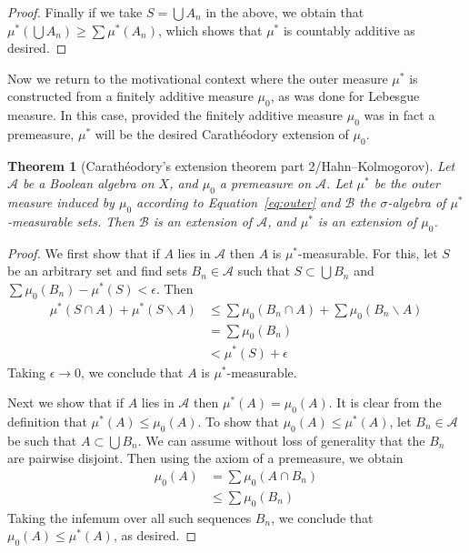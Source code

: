 \documentclass[11pt,oneside]{amsbook}
\renewcommand{\setminus}{\smallsetminus}
\theoremstyle{definition}
\theoremstyle{plain}
\newtheorem{thm}{Theorem}[section]
\theoremstyle{definition}
\theoremstyle{remark}
\numberwithin{equation}{section}
\numberwithin{figure}{section}
\begin{document}
\begin{proof}
  Finally if we take $S=\bigcup A_n$ in the above, we obtain that $\mu^*(\bigcup A_n)\geq\sum\mu^*(A_n)$, which shows that $\mu^*$ is countably additive as desired.
\end{proof}

Now we return to the motivational context where the outer measure $\mu^*$ is constructed from a finitely additive measure $\mu_0$, as was done for Lebesgue measure. In this case, provided the finitely additive measure $\mu_0$ was in fact a premeasure, $\mu^*$ will be the desired Carath\'eodory extension of $\mu_0$.

\begin{thm}[Carath\'eodory's extension theorem part 2/Hahn--Kolmogorov]
  Let $\mathcal A$ be a Boolean algebra on $X$, and $\mu_0$ a premeasure on $\mathcal A$. Let $\mu^*$ be the outer measure induced by $\mu_0$ according to Equation~\eqref{eq:outer} and $\mathcal B$ the $\sigma$-algebra of $\mu^*$-measurable sets. Then $\mathcal B$ is an extension of $\mathcal A$, and $\mu^*$ is an extension of $\mu_0$.
\end{thm}

\begin{proof}
  We first show that if $A$ lies in $\mathcal A$ then $A$ is $\mu^*$-measurable. For this, let $S$ be an arbitrary set and find sets $B_n\in\mathcal A$ such that $S\subset\bigcup B_n$ and $\sum\mu_0(B_n)-\mu^*(S)<\epsilon$. Then
  \begin{align*}
    \mu^*(S\cap A)+\mu^*(S\setminus A)&\leq\sum\mu_0(B_n\cap A)
                                        +\sum\mu_0(B_n\setminus A)\\
                                      &=\sum\mu_0(B_n)\\
                                      &<\mu^*(S)+\epsilon
  \end{align*}
  Taking $\epsilon\to0$, we conclude that $A$ is $\mu^*$-measurable.

  Next we show that if $A$ lies in $\mathcal A$ then $\mu^*(A)=\mu_0(A)$. It is clear from the definition that $\mu^*(A)\leq\mu_0(A)$. To show that $\mu_0(A)\leq\mu^*(A)$, let $B_n\in\mathcal A$ be such that $A\subset\bigcup B_n$. We can assume without loss of generality that the $B_n$ are pairwise disjoint. Then using the axiom of a premeasure, we obtain
  \begin{align*}
    \mu_0(A)&=\sum\mu_0(A\cap B_n)\\
            &\leq\sum\mu_0(B_n)
  \end{align*}
  Taking the infemum over all such sequences $B_n$, we conclude that $\mu_0(A)\leq\mu^*(A)$, as desired.
\end{proof}
\end{document}
